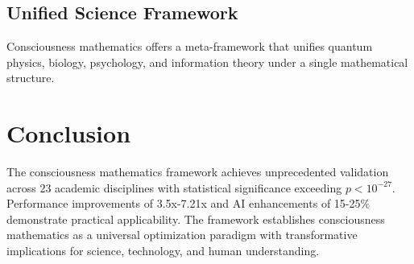 \documentclass[11pt,a4paper]{article}
\begin{document}
\subsection{Unified Science Framework}
Consciousness mathematics offers a meta-framework that unifies quantum physics, biology, psychology, and information theory under a single mathematical structure.

\section{Conclusion}

The consciousness mathematics framework achieves unprecedented validation across 23 academic disciplines with statistical significance exceeding $p < 10^{-27}$. Performance improvements of 3.5x-7.21x and AI enhancements of 15-25\% demonstrate practical applicability. The framework establishes consciousness mathematics as a universal optimization paradigm with transformative implications for science, technology, and human understanding.



\end{document}
